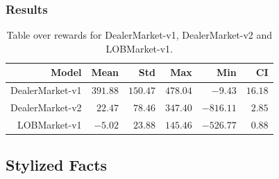 \documentclass[aspectratio=1610]{beamer}
\begin{document}
\begin{frame}
  \frametitle{\hfill Results}
  \begin{table}[H]
    \centering
    \caption{Table over rewards for DealerMarket-v1, DealerMarket-v2 and LOBMarket-v1.}
    \label{tab:dm1}
    \begin{tabular}{rrrrrr}
      \hline
     \textbf{Model} & \textbf{Mean} & \textbf{Std} & \textbf{Max} & \textbf{Min} & \textbf{CI} \\ 
      \hline
    DealerMarket-v1 & $391.88$ & $150.47$ & $478.04$ & $-9.43$ & $16.18$ \\
    DealerMarket-v2 & $22.47$ & $78.46$ & $347.40$ & $-816.11$ & $2.85$  \\
    LOBMarket-v1& $-5.02$ & $23.88$ & $145.46$ & $-526.77$ & $0.88$ \\ 
    
       \hline
\end{tabular}
\end{table}

\begin{table}[H]
    \centering
    \caption{Table over P\&L for DealerMarket-v2 and LOBMarket-v1.}
    \label{tab:pnl1}
\end{table}
  
\end{frame}

\subsection{Stylized Facts}
\end{document}
